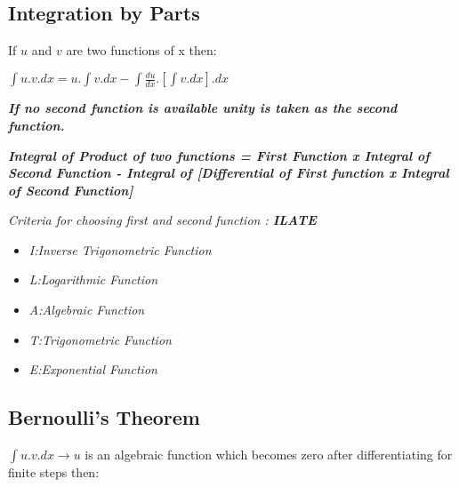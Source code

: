 \subsection{Integration by Parts}
If $u$ and $v$ are two functions of x then: \\
\begin{tcolorbox}
\begin{center}
$ \int u.v.dx = u.\int v.dx - \int\frac{du}{dx}.\left[\int v.dx \right].dx $
\end{center}
\end{tcolorbox}

\vspace{2mm}

\noindent
\textbf{\textit{If no second function is available unity is taken as the second function.}}

\begin{tcolorbox}
\begin{center}
\textbf{\textit{Integral of Product of two functions = First Function x Integral of Second Function - Integral of [Differential of First function x Integral of Second Function] }}
\end{center}
\end{tcolorbox}

\vspace{5mm}

\noindent
\textit{Criteria for choosing first and second function : \textbf{ILATE}}
\begin{itemize}
\item \textit{I:Inverse Trigonometric Function}
\item \textit{L:Logarithmic Function}
\item \textit{A:Algebraic Function}
\item \textit{T:Trigonometric Function}
\item \textit{E:Exponential Function}
\end{itemize}

\vspace{-2mm}

\subsection{Bernoulli's Theorem}

$ \displaystyle \int u.v.dx \rightarrow u $ is an algebraic function which becomes zero after differentiating for finite steps then: 

\vspace{2mm}

